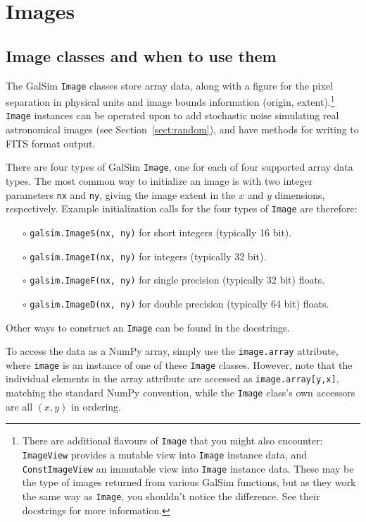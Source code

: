 \documentclass[preprint,11pt]{../../devel/modules/aastex}
\begin{document}
\section{Images}\label{sect:image}

\subsection{Image classes and when to use them}\label{sect:imageclasses}
The GalSim \texttt{Image} classes store array data, along with a
figure for the pixel separation in physical units and image bounds
information (origin, extent).\footnote{
There are additional flavours
of \texttt{Image} that you might also encounter: \texttt{ImageView}
provides a mutable view into \texttt{Image} instance data, and
\texttt{ConstImageView} an immutable view into \texttt{Image}
instance data.  These may be the type of images returned from
various GalSim functions, but as they work the same way as \texttt{Image},
you shouldn't notice the difference.  See their docstrings for more information.}
\texttt{Image} instances can be operated upon to add stochastic noise
simulating real astronomical images (see Section~\ref{sect:random}),
and have methods for writing to FITS format output.

There are four types of GalSim \texttt{Image}, one for each of four
supported array data types.  The most common way to initialize an
image is with two integer parameters \texttt{nx} and \texttt{ny},
giving the image extent in the $x$ and $y$ dimensions, respectively.
Example initialization calls for the four types of \texttt{Image} are
therefore:
\begin{itemize}
\item[$\circ$] \texttt{galsim.ImageS(nx, ny)} {for short integers (typically 16 bit).}

\item[$\circ$] \texttt{galsim.ImageI(nx, ny)} {for integers (typically 32 bit).}

\item[$\circ$] \texttt{galsim.ImageF(nx, ny)} {for single precision (typically 32 bit)
  floats.}

\item[$\circ$] \texttt{galsim.ImageD(nx, ny)} {for double precision (typically 64 bit)
  floats.}

\end{itemize}
Other ways to construct an \texttt{Image} can be found in the docstrings.

To access the data as a NumPy array, simply use the \texttt{image.array}
attribute, where \texttt{image} is an instance of one of these
\texttt{Image} classes.  However, note that the individual elements in
the array attribute are accessed as \texttt{image.array[y,x]}, matching
the standard NumPy convention, while the \texttt{Image} class's own
accessors are all $(x,y)$ in ordering.
\end{document}
